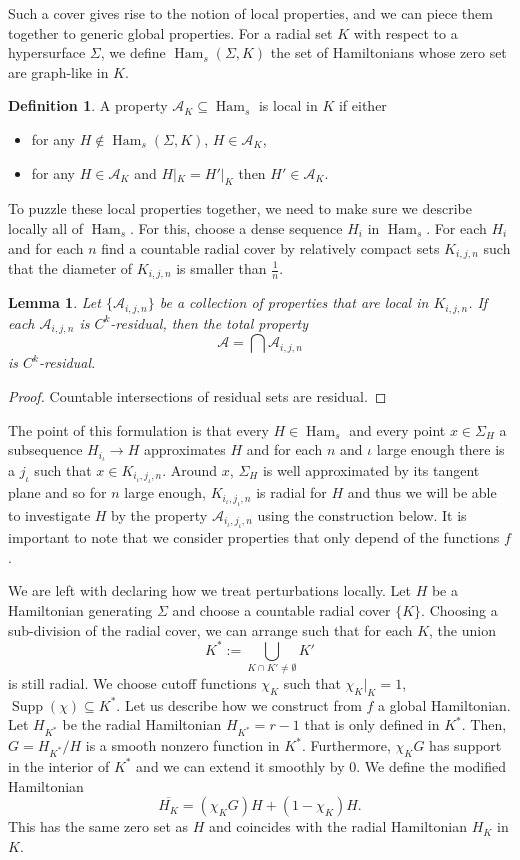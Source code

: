 \documentclass{amsart}
\newcommand{\Acal}{{\mathcal{A}}}
\newcommand{\Ham}{\operatorname{Ham}}
\newtheorem{lemma}[proposition]{Lemma}
\theoremstyle{definition}
\newtheorem{definition}[proposition]{Definition}
\theoremstyle{remark}
\numberwithin{equation}{section}
\begin{document}
Such a cover gives rise to the notion of local properties, and we can piece them together to generic global properties. For a radial set $K$ with respect to a hypersurface $\Sigma$, we define $\Ham_s(\Sigma,K)$ the set of Hamiltonians whose zero set are graph-like in $K$. 
\begin{definition}\label{def:LocalProperty}
    A property $\Acal_K\subseteq \Ham_s$ is local in $K$ if either 
    \begin{itemize}
        \item for any $H\notin\Ham_s(\Sigma,K)$, $H\in\Acal_K$,
        \item for any $H\in\Acal_K$ and $H|_K=H'|_K$ then $H'\in \Acal_K$.
    \end{itemize}    
\end{definition}
To puzzle these local properties together, we need to make sure we describe locally all of $\Ham_s$. For this, choose a dense sequence $H_i$ in $\Ham_s$. For each $H_i$ and for each $n$ find a countable radial cover by relatively compact sets $K_{i,j,n}$ such that the diameter of $K_{i,j,n}$ is smaller than $\frac 1n$.  
\begin{lemma}\label{lem:ReduceToCover}
    Let $\{\Acal_{i,j,n}\}$ be a collection of properties that are local in $K_{i,j,n}$. If each $\Acal_{i,j,n}$ is $C^k$-residual, then the total property 
    $$\Acal=\bigcap \Acal_{i,j,n}$$
    is $C^k$-residual.
\end{lemma}
\begin{proof}
    Countable intersections of residual sets are residual. 
\end{proof}
The point of this formulation is that every $H\in \Ham_s$ and every point $x\in \Sigma_H$ a subsequence $H_{i_\iota}\to H$ approximates $H$ and for each $n$ and $\iota$ large enough there is a $j_\iota$ such that  $x\in K_{i_\iota,j_\iota,n}$. Around $x$, $\Sigma_H$ is well approximated by its tangent plane and so for $n$ large enough,  $K_{i_\iota,j_\iota,n}$ is radial for $H$ and thus we will be able to investigate $H$ by the property $\Acal_{i_\iota,j_\iota,n}$ using the construction below. It is important to note that we consider properties that only depend of the functions $f$.

We are left with declaring how we treat perturbations locally. Let $H$ be a Hamiltonian generating $\Sigma$ and choose a countable radial cover $\{K\}$.
Choosing a sub-division of the radial cover, we can arrange such that for each $K$, the union
$$K^*:=\bigcup_{K\cap K'\neq \emptyset} K'$$
is still radial. We choose cutoff functions $\chi_K$ such that $\chi_K|_K=1$, $\operatorname{Supp}(\chi)\subseteq K^*$. Let us describe how we construct from $f$ a global Hamiltonian. Let $H_{K^*}$ be the radial Hamiltonian $H_{K^*}=r-1$ that is only defined in $K^*$. Then, $G=H_{K^*}/H$ is a smooth nonzero function in $K^*$. Furthermore, $\chi_KG$ has support in the interior of $K^*$ and we can extend it smoothly by 0. We define the modified Hamiltonian 
$$\overline{H_K}=(\chi_K G) H + (1-\chi_K) H.$$
This has the same zero set as $H$ and coincides with the radial Hamiltonian $H_K$ in $K$. 
\end{document}
